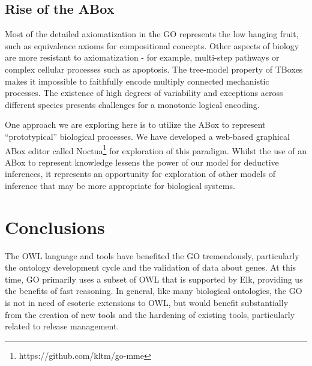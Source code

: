 \documentclass{llncs}
\begin{document}
\subsection{Rise of the ABox}

Most of the detailed axiomatization in the GO represents the low
hanging fruit, such as equivalence axioms for compositional
concepts. Other aspects of biology are more resistant to
axiomatization - for example, multi-step pathways or complex cellular
processes such as apoptosis. The tree-model property of TBoxes makes
it impossible to faithfully encode multiply connected mechanistic
processes. The existence of high degrees of variability and exceptions
across different species presents challenges for a monotonic logical
encoding.

One approach we are exploring here is to utilize the ABox to represent
``prototypical'' biological processes. We have developed a web-based
graphical ABox editor called
Noctua\footnote{https://github.com/kltm/go-mme} for exploration of
this paradigm. Whilst the use of an ABox to represent knowledge
lessens the power of our model for deductive inferences, it represents
an opportunity for exploration of other models of inference that may
be more appropriate for biological systems.

\section{Conclusions}

The OWL language and tools have benefited the GO tremendously,
particularly the ontology development cycle and the validation of data
about genes. At this time, GO primarily uses a subset of OWL that is
supported by Elk, providing us the benefits of fast reasoning. In
general, like many biological ontologies, the GO is not in need of
esoteric extensions to OWL, but would benefit substantially from the
creation of new tools and the hardening of existing tools,
particularly related to release management.









\end{document}
